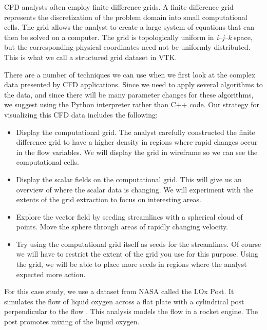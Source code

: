 CFD analysts often employ finite difference grids. A finite difference grid represents the discretization of the problem domain into small computational cells. The grid allows the analyst to create a large system of equations that can then be solved on a computer.
The grid is topologically uniform in \emph{i--j--k} space, but the corresponding physical coordinates need not be uniformly distributed. This is what we call a structured grid dataset in VTK.

There are a number of techniques we can use when we first look at the complex data presented by CFD applications. Since we need to apply several algorithms to the data, and since there will be many parameter changes for these algorithms, we suggest using the Python interpreter rather than C++ code. Our strategy for visualizing this CFD data includes the following:

\begin{itemize}

    \item Display the computational grid. The analyst carefully constructed the finite difference grid to have a higher density in regions where rapid changes occur in the flow variables. We will display the grid in wireframe so we can see the computational cells.

    \item Display the scalar fields on the computational grid. This will give us an overview of where the scalar data is changing. We will experiment with the extents of the grid extraction to focus on interesting areas.

    \item Explore the vector field by seeding streamlines with a spherical cloud of points. Move the sphere through areas of rapidly changing velocity.

    \item Try using the computational grid itself as seeds for the streamlines. Of course we will have to restrict the extent of the grid you use for this purpose. Using the grid, we will be able to place more seeds in regions where the analyst expected more action.

\end{itemize}

For this case study, we use a dataset from NASA called the LOx Post. It simulates the flow of liquid oxygen across a flat plate with a cylindrical post perpendicular to the flow \cite{Rogers86}. This analysis models the flow in a rocket engine. The post promotes mixing of the liquid oxygen.

